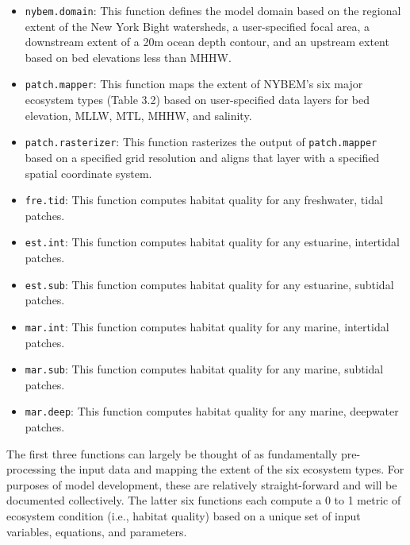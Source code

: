 \documentclass[
]{book}
\begin{document}
\begin{itemize}
\item
  \texttt{nybem.domain}: This function defines the model domain based on the regional extent of the New York Bight watersheds, a user-specified focal area, a downstream extent of a 20m ocean depth contour, and an upstream extent based on bed elevations less than MHHW.
\item
  \texttt{patch.mapper}: This function maps the extent of NYBEM's six major ecosystem types (Table 3.2) based on user-specified data layers for bed elevation, MLLW, MTL, MHHW, and salinity.
\item
  \texttt{patch.rasterizer}: This function rasterizes the output of \texttt{patch.mapper} based on a specified grid resolution and aligns that layer with a specified spatial coordinate system.
\item
  \texttt{fre.tid}: This function computes habitat quality for any freshwater, tidal patches.
\item
  \texttt{est.int}: This function computes habitat quality for any estuarine, intertidal patches.
\item
  \texttt{est.sub}: This function computes habitat quality for any estuarine, subtidal patches.
\item
  \texttt{mar.int}: This function computes habitat quality for any marine, intertidal patches.
\item
  \texttt{mar.sub}: This function computes habitat quality for any marine, subtidal patches.
\item
  \texttt{mar.deep}: This function computes habitat quality for any marine, deepwater patches.
\end{itemize}

The first three functions can largely be thought of as fundamentally pre-processing the input data and mapping the extent of the six ecosystem types. For purposes of model development, these are relatively straight-forward and will be documented collectively. The latter six functions each compute a 0 to 1 metric of ecosystem condition (i.e., habitat quality) based on a unique set of input variables, equations, and parameters.
\end{document}
